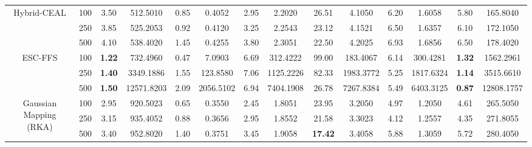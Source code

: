 \documentclass[preprint,12pt]{elsarticle}
\begin{document}
\begin{table}[!t]
{\begin{tabular}{cc|cc|cc|cc|cc|cc|cc}
\multirow{3}{*}{Hybrid-CEAL}    &  100    &  3.50            &  512.5010           &  0.85             &  0.4052            &  2.95              &  2.2020            &  26.51            &  4.1050            &  6.20             &  1.6058            &  5.80             &  165.8040          \\
                                       &  250    &  3.85            &  525.2053           &  0.92             &  0.4120            &  3.25              &  2.2543            &  23.12            &  4.1521            &  6.50             &  1.6357            &  6.10             &  172.1050          \\
                                       &  500    &  4.10            &  538.4020           &  1.45             &  0.4255            &  3.80              &  2.3051            &  22.50            &  4.2025            &  6.93             &  1.6856            &  6.50             &  178.4020          \\ \hline

\multirow{3}{*}{ESC-FFS}               & 100    & \textbf{1.22}   & 732.4960          & 0.47            & 7.0903           & 6.69             & 312.4222         & 99.00          & 183.4067         & 6.14            & 300.4281         & \textbf{1.32}   & 1562.2961        \\
                                       & 250    & \textbf{1.40}   & 3349.1886         & 1.55            & 123.8580         & 7.06             & 1125.2226        & 82.33          & 1983.3772        & 5.25            & 1817.6324        & \textbf{1.14}   & 3515.6610        \\
                                       & 500    & \textbf{1.50}   & 12571.8203        & 2.09            & 2056.5102        & 6.94             & 7404.1908        & 26.78          & 7267.8384        & 5.49            & 6403.3125        & \textbf{0.87}   & 12808.1757       \\ \hline

\multirow{3}{*}{Gaussian Mapping (RKA)} &  100    &  2.95            &  920.5023           &  0.65             &  0.3550            &  2.45              &  1.8051            &  23.95            &  3.2050            &  4.97             &  1.2050            &  4.61             &  265.5050          \\
                                        &  250    &  3.15            &  935.4052           &  0.88             &  0.3656            &  2.95              &  1.8552            &  21.58            &  3.3023            &  4.12             &  1.2557            &  4.35             &  271.8055          \\
                                        &  500    &  3.40            &  952.8020           &  1.40             &  0.3751            &  3.45              &  1.9058            &  \textbf{17.42}   &  3.4058            &  5.88             &  1.3059            &  5.72             &  280.4050          \\ \hline


\end{tabular}}
\end{table}
\end{document}
